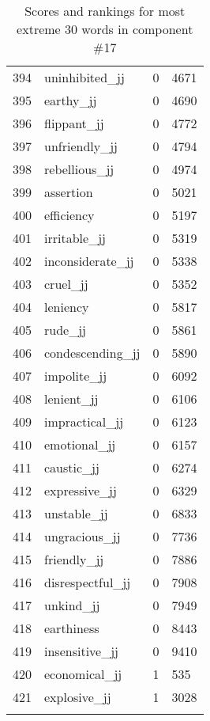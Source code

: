 \begin{longtable}[!htbp]{| rlr@{.}l |}
    394 & uninhibited\_jj & 0 & 4671 \\
    395 & earthy\_jj & 0 & 4690 \\
    396 & flippant\_jj & 0 & 4772 \\
    397 & unfriendly\_jj & 0 & 4794 \\
    398 & rebellious\_jj & 0 & 4974 \\
    399 & assertion & 0 & 5021 \\
    400 & efficiency & 0 & 5197 \\
    401 & irritable\_jj & 0 & 5319 \\
    402 & inconsiderate\_jj & 0 & 5338 \\
    403 & cruel\_jj & 0 & 5352 \\
    404 & leniency & 0 & 5817 \\
    405 & rude\_jj & 0 & 5861 \\
    406 & condescending\_jj & 0 & 5890 \\
    407 & impolite\_jj & 0 & 6092 \\
    408 & lenient\_jj & 0 & 6106 \\
    409 & impractical\_jj & 0 & 6123 \\
    410 & emotional\_jj & 0 & 6157 \\
    411 & caustic\_jj & 0 & 6274 \\
    412 & expressive\_jj & 0 & 6329 \\
    413 & unstable\_jj & 0 & 6833 \\
    414 & ungracious\_jj & 0 & 7736 \\
    415 & friendly\_jj & 0 & 7886 \\
    416 & disrespectful\_jj & 0 & 7908 \\
    417 & unkind\_jj & 0 & 7949 \\
    418 & earthiness & 0 & 8443 \\
    419 & insensitive\_jj & 0 & 9410 \\
    420 & economical\_jj & 1 & 535 \\
    421 & explosive\_jj & 1 & 3028 \\
    \hline
    \caption{Scores and rankings for most extreme 30 words in component \#17} \\
\end{longtable}
